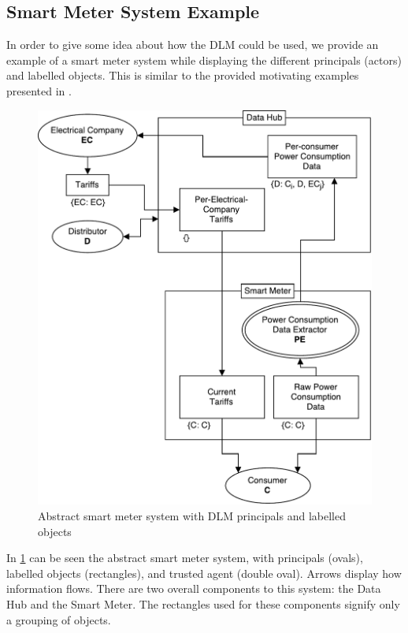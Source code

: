\subsection{Smart Meter System Example}\label{dlm-example}
In order to give some idea about how the DLM could be used, we provide an example of a smart meter system while displaying the different principals (actors) and labelled objects.
This is similar to the provided motivating examples presented in \cite{myers1997decentralized}.

\begin{figure}[h]
\centering
\includegraphics[width=\textwidth]{figures/dlm_sm_example.pdf}
\caption{Abstract smart meter system with DLM principals and labelled objects}
\label{dlm:sm_example}
\end{figure}

In \cref{dlm:sm_example} can be seen the abstract smart meter system, with principals (ovals), labelled objects (rectangles), and trusted agent (double oval).
Arrows display how information flows.
There are two overall components to this system: the Data Hub and the Smart Meter.
The rectangles used for these components signify only a grouping of objects.

